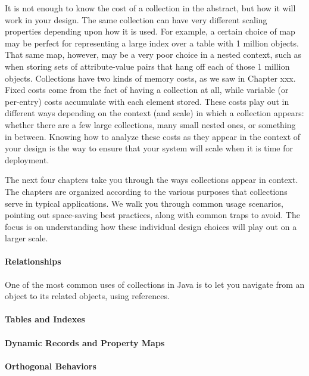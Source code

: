 It is not enough to know the cost
of a collection in the abstract, but how it will work in your design. The same collection can
have very different scaling properties depending upon how it is used. For
example, a certain choice of map may be perfect for representing a large index over a table with 1 million objects. 
That same map, however, may be a very poor
choice in a nested context, such as when storing sets of attribute-value 
pairs that hang off each of those 1 million objects.
Collections have two kinds of memory costs, as we saw in Chapter xxx. Fixed
costs come from the fact of having a collection at all, while variable (or per-entry) costs accumulate 
with each element stored. These costs play out in different ways depending on
the context (and scale) in which a collection appears: whether there are a few
large collections, many small nested ones, or something in between.
Knowing how to analyze these costs as they appear in
the context of your design is the way to ensure that your system will scale
when it is time for deployment.

The next four chapters take you through the ways collections appear in context. 
The chapters are organized according to the various purposes that collections
serve in typical applications.  We walk you through common usage
scenarios, pointing out space-saving best
practices, along with common traps to avoid. The focus is on understanding how
these individual design choices will play out on a larger scale.


\paragraph{Relationships}  One of the most common uses of collections in Java is
to let you navigate from an object to its related objects, using references.
\paragraph{Tables and Indexes}
\paragraph{Dynamic Records and Property Maps}
\paragraph{Orthogonal Behaviors}

